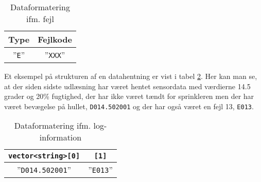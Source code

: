 \begin{table}[h]
	\caption{Dataformatering ifm. fejl}
	\centering
	\begin{tabular}{|c|c|}
		\hline 
		\textbf{Type} & \textbf{Fejlkode} \\ 
		\hline 
		''\verb+E+'' & ''\verb+XXX+'' \\ 
		\hline 
	\end{tabular} 
	\label{table:SWDataprotokol-error}
\end{table}

Et eksempel på strukturen af en datahentning er vist i tabel \ref{table:SWDataprotokol-eksempel}. Her kan man se, at der siden sidste udlæsning har været hentet sensordata med værdierne 14.5 grader og 20\% fugtighed, der har ikke været tændt for sprinkleren men der har været bevægelse på hullet, \verb+D014.502001+ og der har også været en fejl 13, \verb+E013+.

\begin{table}[h]
	\caption{Dataformatering ifm. log-information}
	\centering
	\begin{tabular}{|c|c|}
		\hline
		\verb+vector<string>[0]+ & \verb+[1]+ \\
		\hline 
		''\verb+D014.502001+'' & ''\verb+E013+'' \\ 
		\hline 
	\end{tabular} 
	\label{table:SWDataprotokol-eksempel}
\end{table}